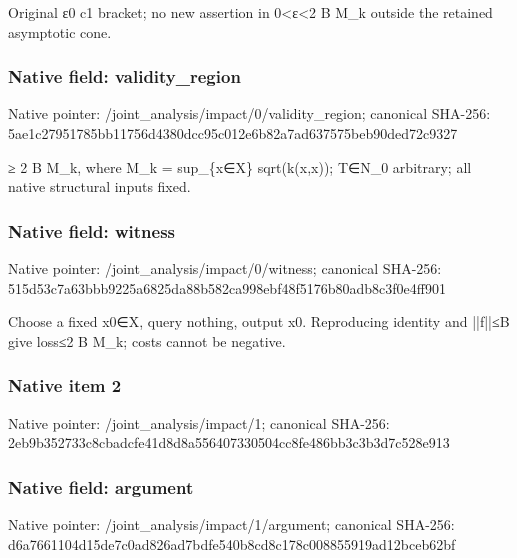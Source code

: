 \documentclass[10pt,a4paper]{article}
\begin{document}
\begingroup\raggedright\sloppy Original {\AtlasUnicodeText ε}\allowbreak{}0 c1 bracket;\allowbreak{} no new assertion in 0<{\AtlasUnicodeText ε}\allowbreak{}<2 B M\_\allowbreak{}k outside the retained asymptotic cone.\par\endgroup

\subsubsection{Native field: validity\_\allowbreak{}region}
Native pointer: /joint\_\allowbreak{}analysis/impact/0/validity\_\allowbreak{}region; canonical SHA-256: 5ae1c27951785bb11756d4380dcc95c012e6b82a7ad637575beb90ded72c9327

\begingroup\raggedright{}\allowbreak{} {\AtlasUnicodeSymbols ≥}\allowbreak{} 2 B M\_\allowbreak{}k,\allowbreak{} where M\_\allowbreak{}k =\allowbreak{} sup\_\allowbreak{}\{x{\AtlasUnicodeSymbols ∈}\allowbreak{}X\} sqrt(k(x,\allowbreak{}x));\allowbreak{} T{\AtlasUnicodeSymbols ∈}\allowbreak{}N\_\allowbreak{}0 arbitrary;\allowbreak{} all native structural inputs fixed.\par\endgroup

\subsubsection{Native field: witness}
Native pointer: /joint\_\allowbreak{}analysis/impact/0/witness; canonical SHA-256: 515d53c7a63bbb9225a6825da88b582ca998ebf48f5176b80adb8c3f0e4ff901

\begingroup\raggedright\sloppy Choose a fixed x0{\AtlasUnicodeSymbols ∈}\allowbreak{}X,\allowbreak{} query nothing,\allowbreak{} output x0. Reproducing identity and ||f||{\AtlasUnicodeSymbols ≤}\allowbreak{}B give loss{\AtlasUnicodeSymbols ≤}\allowbreak{}2 B M\_\allowbreak{}k;\allowbreak{} costs cannot be negative.\par\endgroup

\subsubsection{Native item 2}
Native pointer: /joint\_\allowbreak{}analysis/impact/1; canonical SHA-256: 2eb9b352733c8cbadcfe41d8d8a556407330504cc8fe486bb3c3b3d7c528e913

\subsubsection{Native field: argument}
Native pointer: /joint\_\allowbreak{}analysis/impact/1/argument; canonical SHA-256: d6a7661104d15de7c0ad826ad7bdfe540b8cd8c178c008855919ad12bceb62bf
\end{document}

